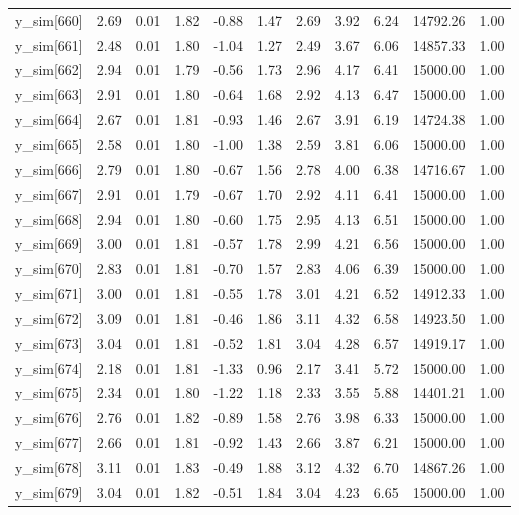 \begin{table}[ht]
\begin{tabular}{rrrrrrrrrrr}
  y\_sim[660] & 2.69 & 0.01 & 1.82 & -0.88 & 1.47 & 2.69 & 3.92 & 6.24 & 14792.26 & 1.00 \\ 
  y\_sim[661] & 2.48 & 0.01 & 1.80 & -1.04 & 1.27 & 2.49 & 3.67 & 6.06 & 14857.33 & 1.00 \\ 
  y\_sim[662] & 2.94 & 0.01 & 1.79 & -0.56 & 1.73 & 2.96 & 4.17 & 6.41 & 15000.00 & 1.00 \\ 
  y\_sim[663] & 2.91 & 0.01 & 1.80 & -0.64 & 1.68 & 2.92 & 4.13 & 6.47 & 15000.00 & 1.00 \\ 
  y\_sim[664] & 2.67 & 0.01 & 1.81 & -0.93 & 1.46 & 2.67 & 3.91 & 6.19 & 14724.38 & 1.00 \\ 
  y\_sim[665] & 2.58 & 0.01 & 1.80 & -1.00 & 1.38 & 2.59 & 3.81 & 6.06 & 15000.00 & 1.00 \\ 
  y\_sim[666] & 2.79 & 0.01 & 1.80 & -0.67 & 1.56 & 2.78 & 4.00 & 6.38 & 14716.67 & 1.00 \\ 
  y\_sim[667] & 2.91 & 0.01 & 1.79 & -0.67 & 1.70 & 2.92 & 4.11 & 6.41 & 15000.00 & 1.00 \\ 
  y\_sim[668] & 2.94 & 0.01 & 1.80 & -0.60 & 1.75 & 2.95 & 4.13 & 6.51 & 15000.00 & 1.00 \\ 
  y\_sim[669] & 3.00 & 0.01 & 1.81 & -0.57 & 1.78 & 2.99 & 4.21 & 6.56 & 15000.00 & 1.00 \\ 
  y\_sim[670] & 2.83 & 0.01 & 1.81 & -0.70 & 1.57 & 2.83 & 4.06 & 6.39 & 15000.00 & 1.00 \\ 
  y\_sim[671] & 3.00 & 0.01 & 1.81 & -0.55 & 1.78 & 3.01 & 4.21 & 6.52 & 14912.33 & 1.00 \\ 
  y\_sim[672] & 3.09 & 0.01 & 1.81 & -0.46 & 1.86 & 3.11 & 4.32 & 6.58 & 14923.50 & 1.00 \\ 
  y\_sim[673] & 3.04 & 0.01 & 1.81 & -0.52 & 1.81 & 3.04 & 4.28 & 6.57 & 14919.17 & 1.00 \\ 
  y\_sim[674] & 2.18 & 0.01 & 1.81 & -1.33 & 0.96 & 2.17 & 3.41 & 5.72 & 15000.00 & 1.00 \\ 
  y\_sim[675] & 2.34 & 0.01 & 1.80 & -1.22 & 1.18 & 2.33 & 3.55 & 5.88 & 14401.21 & 1.00 \\ 
  y\_sim[676] & 2.76 & 0.01 & 1.82 & -0.89 & 1.58 & 2.76 & 3.98 & 6.33 & 15000.00 & 1.00 \\ 
  y\_sim[677] & 2.66 & 0.01 & 1.81 & -0.92 & 1.43 & 2.66 & 3.87 & 6.21 & 15000.00 & 1.00 \\ 
  y\_sim[678] & 3.11 & 0.01 & 1.83 & -0.49 & 1.88 & 3.12 & 4.32 & 6.70 & 14867.26 & 1.00 \\ 
  y\_sim[679] & 3.04 & 0.01 & 1.82 & -0.51 & 1.84 & 3.04 & 4.23 & 6.65 & 15000.00 & 1.00 \\ 

\end{tabular}
\end{table}
